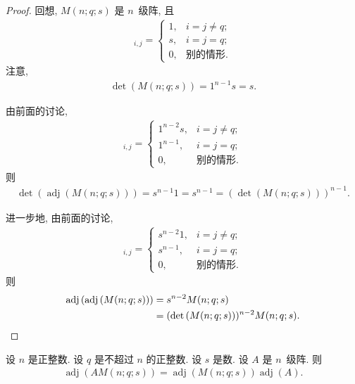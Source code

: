 \documentclass[../libro.tex]{subfiles}
\begin{document}
\begin{proof}
    回想, \(M(n; q; s)\) 是 \(n\)~级阵, 且
    \begin{align*}
        [M(n; q; s)]_{i,j} =
        \begin{cases}
            1, & i = j \neq q; \\
            s, & i = j = q;    \\
            0, & \text{别的情形}.
        \end{cases}
    \end{align*}
    注意,
    \begin{align*}
        \det {(M(n; q; s))} = 1^{n-1} s = s.
    \end{align*}

    由前面的讨论,
    \begin{align*}
        [\operatorname{adj} {(M(n; q; s))}]_{i,j} =
        \begin{cases}
            1^{n-2} s, & i = j \neq q; \\
            1^{n-1},   & i = j = q;    \\
            0,         & \text{别的情形}.
        \end{cases}
    \end{align*}
    则
    \begin{align*}
        \det {(\operatorname{adj} {(M(n; q; s))})}
        = s^{n-1} 1
        = s^{n-1}
        = (\det {(M(n; q; s))})^{n-1}.
    \end{align*}

    进一步地, 由前面的讨论,
    \begin{align*}
        [\operatorname{adj} {(
                    \operatorname{adj} {(M(n; q; s))}
        )}]_{i,j} =
        \begin{cases}
            s^{n-2} 1, & i = j \neq q; \\
            s^{n-1},   & i = j = q;    \\
            0,         & \text{别的情形}.
        \end{cases}
    \end{align*}
    则
    \begin{align*}
        \operatorname{adj} {(\operatorname{adj} {(M(n; q; s))})}
        = {} & s^{n-2} M(n; q; s)                      \\
        = {} & (\det {(M(n; q; s))})^{n-2} M(n; q; s).
        \qedhere
    \end{align*}
\end{proof}

\begin{theorem}
    设 \(n\) 是正整数.
    设 \(q\) 是不超过 \(n\) 的正整数.
    设 \(s\) 是数.
    设 \(A\) 是 \(n\)~级阵.
    则
    \begin{align*}
        \operatorname{adj} {(A M(n; q; s))}
        =
        \operatorname{adj} {(M(n; q; s))}
        \operatorname{adj} {(A)}.
    \end{align*}
\end{theorem}
\end{document}
